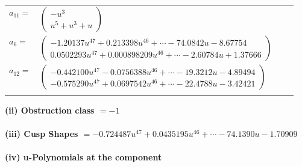 \documentclass[1p]{elsarticle_modified}
\theoremstyle{definition}
\begin{document}
\begin{tabular}{m{7pt} m{180pt} m{7pt} m{180pt} }
\flushright $a_{11}=$&$\begin{pmatrix}- u^3\\u^5+u^3+u\end{pmatrix}$ \\
\flushright $a_{6}=$&$\begin{pmatrix}-1.20137 u^{47}+0.213398 u^{46}+\cdots-74.0842 u-8.67754\\0.0502293 u^{47}+0.000898209 u^{46}+\cdots-2.60784 u+1.37666\end{pmatrix}$ \\
\flushright $a_{12}=$&$\begin{pmatrix}-0.442100 u^{47}-0.0756388 u^{46}+\cdots-19.3212 u-4.89494\\-0.575290 u^{47}+0.0697542 u^{46}+\cdots-22.4788 u-3.42421\end{pmatrix}$\\&\end{tabular}
\flushleft \textbf{(ii) Obstruction class $= -1$}\\~\\
\flushleft \textbf{(iii) Cusp Shapes $= -0.724487 u^{47}+0.0435195 u^{46}+\cdots-74.1390 u-1.70909$}\\~\\
\newpage\renewcommand{\arraystretch}{1}
\flushleft \textbf{(iv) u-Polynomials at the component}\newline \\
\end{document}
